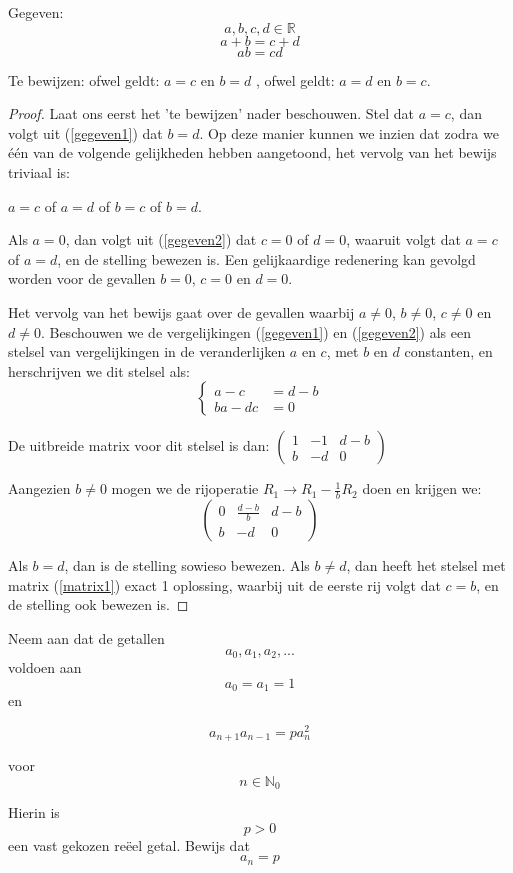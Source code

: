 \documentclass[hidequestions]{homework}
\begin{document}



Gegeven:
\[a, b, c, d \in \mathbb{R}\] 
\begin{equation}\label{gegeven1}a + b = c + d\end{equation}
\begin{equation}\label{gegeven2}ab = cd\end{equation}

Te bewijzen: 
ofwel geldt: \(a=c\) en \(b=d\) , ofwel geldt: \(a=d\) en \(b=c\). 


\begin{proof}
Laat ons eerst het 'te bewijzen' nader beschouwen. 
Stel dat \(a=c\), dan volgt uit (\ref{gegeven1}) dat \(b=d\). Op deze manier kunnen we inzien dat zodra we \'{e}\'{e}n van de volgende gelijkheden hebben aangetoond, het vervolg van het bewijs triviaal is: 

\(a=c\) of \(a=d\) of \(b=c\) of \(b=d\). 


Als \(a = 0\), dan volgt uit (\ref{gegeven2}) dat \(c = 0\) of  \(d = 0\), waaruit volgt dat \(a = c\) of \(a = d\), en de stelling bewezen is. Een gelijkaardige redenering kan gevolgd worden voor de gevallen \(b = 0\), \(c = 0\) en \(d = 0\). 

Het vervolg van het bewijs gaat over de gevallen waarbij  \(a \neq 0\),  \(b \neq 0\),  \(c \neq 0\) en  \(d \neq 0\). Beschouwen we de vergelijkingen (\ref{gegeven1}) en (\ref{gegeven2}) als een stelsel van vergelijkingen in de veranderlijken \(a\) en \(c\), met \(b\) en \(d\) constanten, en herschrijven we dit stelsel als: 
\[\left\{ 
\begin{aligned}
a-c &= d-b\\
ba -dc &= 0 
\end{aligned} 
\right.\]

De uitbreide matrix voor dit stelsel is dan: 
$\begin{pmatrix}
1 & -1 & d-b\\
b & -d & 0
\end{pmatrix}$

Aangezien \(b \neq 0\) mogen we de rijoperatie $R_1 \longrightarrow R_1 - \frac{1}{b}R_2$ doen en krijgen we: 
\begin{equation}\label{matrix1}
\begin{pmatrix}
0 & \frac{d-b}{b} & d-b\\
b & -d & 0
\end{pmatrix}
\end{equation}

Als \(b=d\), dan is de stelling sowieso bewezen. Als \(b \neq d\), dan heeft het stelsel met matrix (\ref{matrix1}) exact 1 oplossing, waarbij uit de eerste rij volgt dat \(c=b\), en de stelling ook bewezen is. 

\end{proof}





\problem

Neem aan dat de getallen \[a_0, a_1, a_2, . . .\] voldoen aan \[a_0 = a_1 = 1\] en

\[a_{n+1} a_{n-1} = pa_n^2\] 

voor \[n \in \mathbb{N}_0\]
 
Hierin is \[p > 0\] een vast gekozen re\"{e}el getal. 
Bewijs dat \[a_n = p\] 
\end{document}
